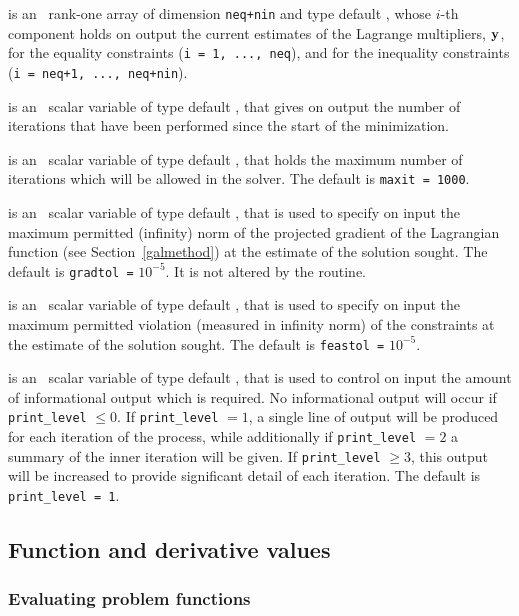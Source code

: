 \documentclass{galahad}
\begin{document}
\begin{description}
 is an \optional\ rank-one array of dimension {\tt neq+nin} and type 
default \realdp, whose $i$-th component holds on output the current
estimates of the Lagrange multipliers, ${\mathbf{y}}$, for the equality constraints
({\tt i = 1, ..., neq}), and for the inequality constraints  ({\tt i = neq+1,
  ..., neq+nin}).

 is an \optional\ scalar variable of type default \integer, that gives 
on output the number of iterations that have been performed since the start of
the  minimization.

 is an \optional\ scalar variable of type default \integer, that
holds the maximum number of iterations which will be allowed in the solver.
The default is {\tt maxit = 1000}.

 is an \optional\ scalar variable of type default \realdp, 
that is used to specify on input the maximum permitted (infinity)
norm of the projected gradient of the Lagrangian function 
(see Section~\ref{galmethod}) at the estimate of the solution sought.
The default is {\tt gradtol =} $10^{-5}$.  It is not altered by the routine.

 is an \optional\ scalar variable of type default \realdp, 
that is used to specify on input the maximum permitted violation (measured in
infinity norm) of the constraints at the estimate of the solution sought.
The default is {\tt feastol =} $10^{-5}$.

 is an \optional\ scalar variable of type default \integer,
that is used to control on input the amount of informational output which is
required. No informational output will occur if {\tt print\_level} $\leq 0$. If 
{\tt print\_level} $= 1$, a single line of output will be produced for each
iteration of the process, while additionally if {\tt print\_level} $= 2$
a summary of the inner iteration will be given.
If {\tt print\_level} $\geq 3$, this output will be
increased to provide significant detail of each iteration.
The default is {\tt print\_level = 1}.
\end{description}

\subsection{Function and derivative values\label{fdv}}


\subsubsection{Evaluating problem functions\label{pfe}}
\end{document}
